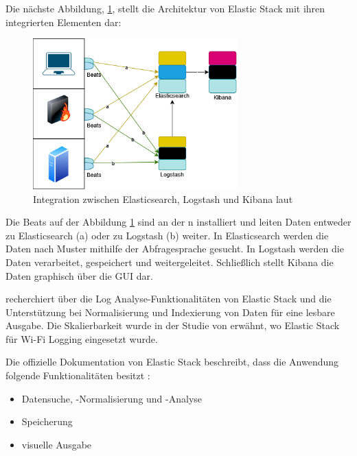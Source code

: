 \newpage
Die nächste Abbildung, \ref{fig:Intregation_ELK}, stellt die Architektur von Elastic Stack mit ihren integrierten Elementen dar:

\begin{figure}[H]
   \centering
   \includegraphics[width=0.7\textwidth]{assets/ElasticStack.drawio.png}
   \caption[Integration zwischen Elasticsearch, Logstash und Kibana]
   {Integration zwischen Elasticsearch, Logstash und Kibana laut \cite{packt_elkstack} }
   \label{fig:Intregation_ELK}
   \centering
\end{figure}

Die Beats auf der Abbildung \ref{fig:Intregation_ELK} sind an der n installiert und leiten Daten entweder zu Elasticsearch (a) oder zu Logstash (b) weiter. In Elasticsearch werden die Daten nach Muster mithilfe der Abfragesprache  gesucht. In Logstash werden die Daten verarbeitet, gespeichert und weitergeleitet. Schließlich stellt Kibana die Daten graphisch über die \gls{GUI} dar\citep{Jain_LMELK}.

\cite{Advani_elkstakc} recherchiert über die Log Analyse-Funktionalitäten von Elastic Stack und die Unterstützung bei Normalisierung und Indexierung von Daten für eine lesbare Ausgabe. Die Skalierbarkeit wurde in der Studie von \cite{Wang_elkwifi} erwähnt, wo Elastic Stack für Wi-Fi Logging eingesetzt wurde.

Die offizielle Dokumentation von Elastic Stack beschreibt, dass die Anwendung folgende Funktionalitäten besitzt \citep{elastic_docs}:

\begin{itemize}[noitemsep]
   \item Datensuche, -Normalisierung und -Analyse
   \item Speicherung
   \item visuelle Ausgabe
\end{itemize}

